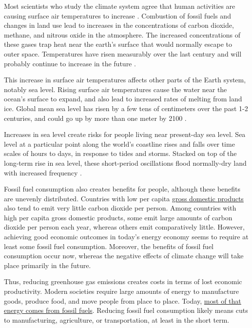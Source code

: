 \documentclass[
  11pt,
]{book}
\begin{document}
Most scientists who study the climate system agree that human activities are causing surface air temperatures to increase \citep{Oreskes2007-fj}. Combustion of fossil fuels and changes in land use lead to increases in the concentrations of carbon dioxide, methane, and nitrous oxide in the atmosphere. The increased concentrations of these gases trap heat near the earth's surface that would normally escape to outer space. Temperatures have risen measurably over the last century and will probably continue to increase in the future \citep{Ipcc2013-px, Collins2013-yi}.

This increase in surface air temperatures affects other parts of the Earth system, notably sea level. Rising surface air temperatures cause the water near the ocean's surface to expand, and also lead to increased rates of melting from land ice. Global mean sea level has risen by a few tens of centimeters over the past 1-2 centuries, and could go up by more than one meter by 2100 \citep{Parris2012-qw, Ipcc2013-px, Church2013-el}.

Increases in sea level create risks for people living near present-day sea level. Sea level at a particular point along the world's coastline rises and falls over time scales of hours to days, in response to tides and storms. Stacked on top of the long-term rise in sea level, these short-period oscillations flood normally-dry land with increased frequency \citep[e.g.~][]{Spanger-Siegfried2014-mx}.

Fossil fuel consumption also creates benefits for people, although these benefits are unevenly distributed. Countries with low per capita \href{https://en.wikipedia.org/wiki/Gross_domestic_product}{gross domestic products} also tend to emit very little carbon dioxide per person. Among countries with high per capita gross domestic products, some emit large amounts of carbon dioxide per person each year, whereas others emit comparatively little. However, achieving good economic outcomes in today's energy economy seems to require at least some fossil fuel consumption. Moreover, the benefits of fossil fuel consumption occur now, whereas the negative effects of climate change will take place primarily in the future.

Thus, reducing greenhouse gas emissions creates costs in terms of lost economic productivity. Modern societies require large amounts of energy to manufacture goods, produce food, and move people from place to place. Today, \href{https://www.iea.org/fuels-and-technologies}{most of that energy comes from fossil fuels}. Reducing fossil fuel consumption likely means cuts to manufacturing, agriculture, or transportation, at least in the short term.
\end{document}
